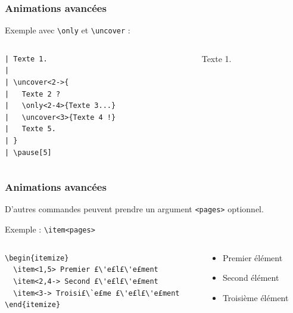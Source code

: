 \begin{frame}[fragile]
  \frametitle{Animations avancées}

Exemple avec \lstinline?\only? et \lstinline?\uncover? :
\begin{columns}
  \begin{column}{0.35\textwidth}
\begin{lstlisting}
| Texte 1.
| 
| \uncover<2->{
|   Texte 2 ?
|   \only<2-4>{Texte 3...}
|   \uncover<3>{Texte 4 !}
|   Texte 5.
| }
| \pause[5]
\end{lstlisting}
  \end{column}
  \begin{column}{0.60\textwidth}
\rmfamily
Texte 1.

\pause[5]
  \end{column}
\end{columns}
\end{frame}



\begin{frame}[fragile]
  \frametitle{Animations avancées}

D'autres commandes peuvent prendre un argument \lstinline?<pages>? optionnel.

\bigskip
Exemple : \lstinline?\item<pages>?
\begin{columns}
  \begin{column}{0.40\textwidth}
\begin{lstlisting}
\begin{itemize}
  \item<1,5> Premier £\'e£l£\'e£ment
  \item<2,4-> Second £\'e£l£\'e£ment
  \item<3-> Troisi£\`e£me £\'e£l£\'e£ment
\end{itemize}\end{lstlisting}
  \end{column}
  \begin{column}{0.40\textwidth}
\rmfamily
\begin{itemize}
  \item<1,5> Premier élément
  \item<2,4-> Second élément
  \item<3-> Troisième élément
\end{itemize}
  \end{column}
\end{columns}

\pause[5]
\end{frame}



